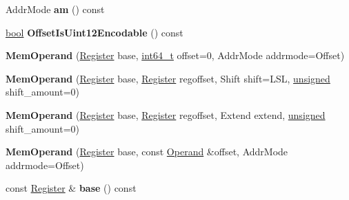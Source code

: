 \begin{DoxyCompactItemize}
\item 
\mbox{\label{classv8_1_1internal_1_1MemOperand_aeace4301e1700d1bb02b1c3c674be3ba}} 
Addr\+Mode {\bfseries am} () const
\item 
\mbox{\label{classv8_1_1internal_1_1MemOperand_a75b767518fa53c30f527dd38025b6142}} 
\mbox{\hyperlink{classbool}{bool}} {\bfseries Offset\+Is\+Uint12\+Encodable} () const
\item 
\mbox{\label{classv8_1_1internal_1_1MemOperand_ae9fd00bb795a6167aad166523c3638cd}} 
{\bfseries Mem\+Operand} (\mbox{\hyperlink{classv8_1_1internal_1_1Register}{Register}} base, \mbox{\hyperlink{classint64__t}{int64\+\_\+t}} offset=0, Addr\+Mode addrmode=Offset)
\item 
\mbox{\label{classv8_1_1internal_1_1MemOperand_a562e2fbd4b0504f796639ef844aa1e50}} 
{\bfseries Mem\+Operand} (\mbox{\hyperlink{classv8_1_1internal_1_1Register}{Register}} base, \mbox{\hyperlink{classv8_1_1internal_1_1Register}{Register}} regoffset, Shift shift=L\+SL, \mbox{\hyperlink{classunsigned}{unsigned}} shift\+\_\+amount=0)
\item 
\mbox{\label{classv8_1_1internal_1_1MemOperand_a55149be1fde3109b1c4cbdd7b7dfa288}} 
{\bfseries Mem\+Operand} (\mbox{\hyperlink{classv8_1_1internal_1_1Register}{Register}} base, \mbox{\hyperlink{classv8_1_1internal_1_1Register}{Register}} regoffset, Extend extend, \mbox{\hyperlink{classunsigned}{unsigned}} shift\+\_\+amount=0)
\item 
\mbox{\label{classv8_1_1internal_1_1MemOperand_a4fbd893ed38c7cf0c5516997eecefd20}} 
{\bfseries Mem\+Operand} (\mbox{\hyperlink{classv8_1_1internal_1_1Register}{Register}} base, const \mbox{\hyperlink{classv8_1_1internal_1_1Operand}{Operand}} \&offset, Addr\+Mode addrmode=Offset)
\item 
\mbox{\label{classv8_1_1internal_1_1MemOperand_aa1c94e8470808fc3da808eec593df34e}} 
const \mbox{\hyperlink{classv8_1_1internal_1_1Register}{Register}} \& {\bfseries base} () const
\item 

\end{DoxyCompactItemize}

